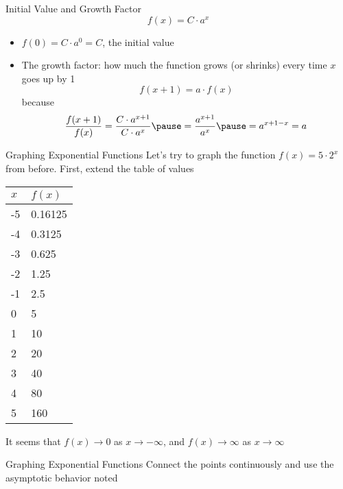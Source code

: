 \documentclass[]{beamer}
\begin{document}
	\begin{frame}{Initial Value and Growth Factor}
		\begin{equation*}
			f(x) = C\cdot a^x
		\end{equation*}
		\vfill
		\begin{itemize}
			\item $f(0) = C\cdot a^0 = C$, the initial value
			\vfill\pause
			\item The growth factor: how much the function grows (or shrinks) every time $x$ goes up by 1
			\begin{equation*}
				f(x+1) = a\cdot f(x)
			\end{equation*}
			\pause
			because
			\begin{equation*}
				\frac{f(x+1)}{f(x)} = \frac{C\cdot a^{x+1}}{C\cdot a^x} \pause = \frac{a^{x+1}}{a^x} \pause = a^{x+1-x} = a
			\end{equation*}
		\end{itemize}
	\end{frame}
	
	\begin{frame}{Graphing Exponential Functions}
		Let's try to graph the function $f(x) = 5\cdot 2^x$ from before. First, extend the table of values
		\pause\vfill
		\begin{center}
			\begin{tabular}{@{}l|l@{}}
				$x$ & $f(x)$ \\
				\midrule
				-5 & 0.16125 \\
				-4 & 0.3125 \\
				-3 & 0.625 \\
				-2 & 1.25 \\
				-1 & 2.5 \\
				0 & 5 \\
				1 & 10 \\
				2 & 20 \\
				3 & 40 \\
				4 & 80 \\
				5 & 160 \\
			\end{tabular}
		\end{center}
		\vfill\pause
		It seems that $f(x) \to 0$ as $x \to -\infty$, and $f(x) \to \infty$ as $x \to \infty$
	\end{frame}
	\begin{frame}{Graphing Exponential Functions}
		Connect the points continuously and use the asymptotic behavior noted
		\vfill
		\begin{center}
		\end{center}
		\vfill
	\end{frame}
\end{document}
